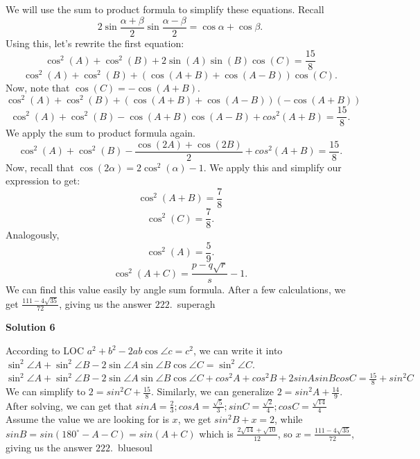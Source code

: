 \begin{enumerate}
We will use the sum to product formula to simplify these equations. Recall 
 \[2\sin{\frac{\alpha+\beta}{2}}\sin{\frac{\alpha-\beta}{2}} = \cos{\alpha}+\cos{\beta}.\] Using this, let's rewrite the first equation: 
 \[\cos^2(A) + \cos^2(B) + 2 \sin(A) \sin(B) \cos(C) = \frac{15}{8}\] 
 \[\cos^2(A) + \cos^2(B) + (\cos(A+B)+\cos(A-B))\cos(C).\] Now, note that $\cos(C)=-\cos(A+B)$. 
 \[\cos^2(A) + \cos^2(B) + (\cos(A+B)+\cos(A-B))(-\cos(A+B))\] 
 \[\cos^2(A) + \cos^2(B) - \cos(A+B)\cos(A-B)+cos^2(A+B)=\frac{15}{8}.\] We apply the sum to product formula again. 
 \[\cos^2(A) + \cos^2(B) - \frac{\cos(2A)+\cos(2B)}{2}+cos^2(A+B)=\frac{15}{8}.\] Now, recall that $\cos(2\alpha)=2\cos^2(\alpha)-1$. We apply this and simplify our expression to get: 
 \[\cos^2(A+B)=\frac{7}{8}\] 
 \[\cos^2(C)=\frac{7}{8}.\] Analogously, 
 \[\cos^2(A)=\frac{5}{9}.\] 
 \[\cos^2(A+C)=\frac{p-q\sqrt{r}}{s}-1.\] We can find this value easily by angle sum formula. After a few calculations, we get $\frac{111 - 4\sqrt{35}}{72}$, giving us the answer $\boxed{222}$.~superagh

 



\textbf{Solution 6}

According to LOC $a^2+b^2-2ab\cos{\angle{c}}=c^2$, we can write it into $\sin^2{\angle{A}}+\sin^2{\angle{B}}-2\sin{\angle{A}}\sin{\angle{B}}\cos{\angle{C}}=\sin^2{\angle{C}}$. $\sin^2{\angle{A}}+\sin^2{\angle{B}}-2\sin{\angle{A}}\sin{\angle{B}}\cos{\angle{C}}+cos^2A+cos^2B+2sinAsinBcosC=\frac{15}{8}+sin^2C$ We can simplify to $2=sin^2C+\frac{15}{8}$. Similarly, we can generalize $2=sin^2A+\frac{14}{9}$. After solving, we can get that $sinA=\frac{2}{3}; cosA=\frac{\sqrt{5}}{3}; sinC=\frac{\sqrt{2}}{4}; cosC=\frac{\sqrt{14}}{4}$Assume the value we are looking for is $x$, we get $sin^2B+x=2$, while $sinB=sin(180^{\circ}-A-C)=sin(A+C)$ which is $\frac{2\sqrt{14}+\sqrt{10}}{12}$, so $x=\frac{111 - 4\sqrt{35}}{72}$, giving us the answer $\boxed{222}$.~bluesoul

 


 


\end{enumerate}